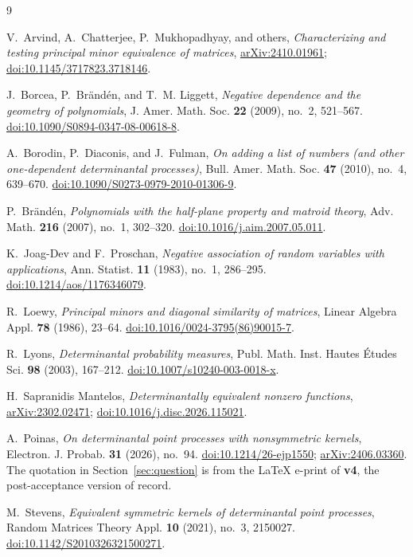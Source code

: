 \documentclass[11pt]{amsart}
\theoremstyle{remark}
\begin{document}
\begin{thebibliography}{9}

V.~Arvind, A.~Chatterjee, P.~Mukhopadhyay, and others,
\emph{Characterizing and testing principal minor equivalence of matrices},
\href{https://arxiv.org/abs/2410.01961}{arXiv:2410.01961};
\href{https://doi.org/10.1145/3717823.3718146}{doi:10.1145/3717823.3718146}.

J.~Borcea, P.~Br\"and\'en, and T.~M. Liggett,
\emph{Negative dependence and the geometry of polynomials},
J. Amer. Math. Soc. \textbf{22} (2009), no.~2, 521--567.
\href{https://doi.org/10.1090/S0894-0347-08-00618-8}{doi:10.1090/S0894-0347-08-00618-8}.

A.~Borodin, P.~Diaconis, and J.~Fulman,
\emph{On adding a list of numbers (and other one-dependent determinantal processes)},
Bull. Amer. Math. Soc. \textbf{47} (2010), no.~4, 639--670.
\href{https://doi.org/10.1090/S0273-0979-2010-01306-9}{doi:10.1090/S0273-0979-2010-01306-9}.

P.~Br\"and\'en,
\emph{Polynomials with the half-plane property and matroid theory},
Adv. Math. \textbf{216} (2007), no.~1, 302--320.
\href{https://doi.org/10.1016/j.aim.2007.05.011}{doi:10.1016/j.aim.2007.05.011}.

K.~Joag-Dev and F.~Proschan,
\emph{Negative association of random variables with applications},
Ann. Statist. \textbf{11} (1983), no.~1, 286--295.
\href{https://doi.org/10.1214/aos/1176346079}{doi:10.1214/aos/1176346079}.

R.~Loewy,
\emph{Principal minors and diagonal similarity of matrices},
Linear Algebra Appl. \textbf{78} (1986), 23--64.
\href{https://doi.org/10.1016/0024-3795(86)90015-7}{doi:10.1016/0024-3795(86)90015-7}.

R.~Lyons,
\emph{Determinantal probability measures},
Publ. Math. Inst. Hautes \'Etudes Sci. \textbf{98} (2003), 167--212.
\href{https://doi.org/10.1007/s10240-003-0018-x}{doi:10.1007/s10240-003-0018-x}.

H.~Sapranidis Mantelos,
\emph{Determinantally equivalent nonzero functions},
\href{https://arxiv.org/abs/2302.02471}{arXiv:2302.02471};
\href{https://doi.org/10.1016/j.disc.2026.115021}{doi:10.1016/j.disc.2026.115021}.

A.~Poinas,
\emph{On determinantal point processes with nonsymmetric kernels},
Electron. J. Probab. \textbf{31} (2026), no.~94.
\href{https://doi.org/10.1214/26-ejp1550}{doi:10.1214/26-ejp1550};
\href{https://arxiv.org/abs/2406.03360}{arXiv:2406.03360}.
The quotation in Section~\ref{sec:question} is from the \LaTeX{} e-print of \textbf{v4}, the
post-acceptance version of record.

M.~Stevens,
\emph{Equivalent symmetric kernels of determinantal point processes},
Random Matrices Theory Appl. \textbf{10} (2021), no.~3, 2150027.
\href{https://doi.org/10.1142/S2010326321500271}{doi:10.1142/S2010326321500271}.

\end{thebibliography}
\end{document}
